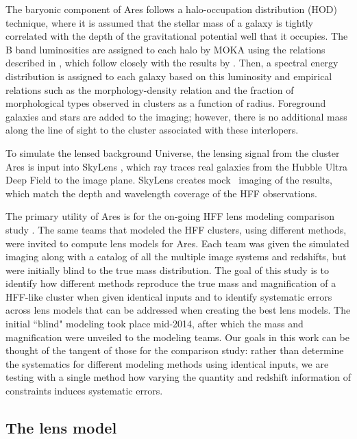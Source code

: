 The baryonic component of Ares follows a halo-occupation distribution (HOD) technique, where it is assumed that the stellar mass of a galaxy is tightly correlated with the depth of the gravitational potential well that it occupies. The B band luminosities are assigned to each halo by MOKA using the relations described in \citet{Giocoli:2012lr}, which follow closely with the results by \cite{Wang:2006kk}. Then, a spectral energy distribution is assigned to each galaxy based on this luminosity and
empirical relations such as the morphology-density relation and the fraction of morphological types observed in clusters as a function of radius. Foreground galaxies and stars are added to the imaging; however, there is no additional mass along the line of sight to the cluster associated with these interlopers.

To simulate the lensed background Universe, the lensing signal from the cluster Ares is input into SkyLens \citep{Meneghetti:2010mi,Meneghetti:2008oz}, which ray traces real galaxies from the Hubble Ultra Deep Field \citep{Beckwith:2006rt} to the image plane. SkyLens creates mock \hst\ imaging of the results, which match the depth and wavelength coverage of the HFF observations.

The primary utility of Ares is for the on-going HFF lens modeling comparison study \citep{Meneghetti:2016xe}. The same teams that modeled the HFF clusters, using different methods, were invited to compute lens models for Ares. Each team was given the simulated imaging along with a catalog of all the multiple image systems and redshifts, but were initially blind to the true mass distribution. The goal of this study is to identify how different methods reproduce the true mass and magnification of a HFF-like cluster when given identical inputs and to identify systematic errors across lens models that can be addressed when creating the best lens models. The initial ``blind" modeling took place mid-2014, after which the mass and magnification were unveiled to the modeling teams. Our goals in this work can be thought of the tangent of those for the comparison study: rather than determine the systematics for different modeling methods using identical inputs, we are testing with a single method how varying the quantity and redshift information of constraints induces systematic errors.

\subsection{The lens model}
\label{chap3:subsec:fiducial_model}

